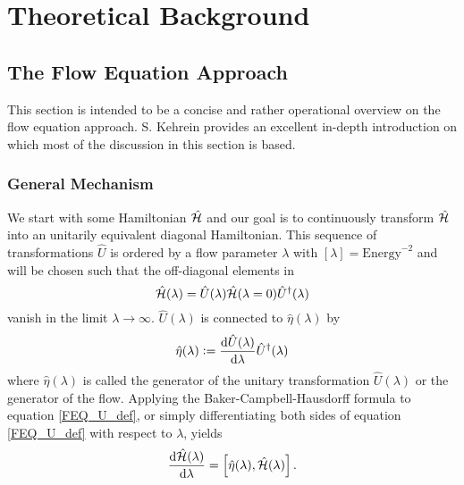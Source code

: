 \chapter{Theoretical Background}\label{Theoretical Background}
\section{The Flow Equation Approach}
This section is intended to be a concise and rather operational overview on the flow equation approach. S. Kehrein \cite{kehrein2006flow}  provides an excellent in-depth introduction on which most of the discussion in this section is based.
\subsection{General Mechanism}\label{General Mechanism}
We start with some Hamiltonian $\hat{\mathcal{H}}$ and our goal is to continuously transform $\hat{\mathcal{H}}$ into an unitarily equivalent diagonal Hamiltonian. This sequence of transformations $\hat U$ is ordered by a flow parameter $\lambda$ with $\left[\lambda\right]=\mathrm{Energy}^{-2}$ and will be chosen such that the off-diagonal elements in  
\begin{equation}\label{FEQ_U_def}
\hat{\mathcal{H}}(\lambda)=\hat U(\lambda)\hat{\mathcal{H}} (\lambda = 0)\hat U^\dagger (\lambda)
\end{equation}
vanish in the limit $\lambda\rightarrow\infty$. $\hat U(\lambda)$ is connected to $\hat\eta(\lambda)$ by
\begin{equation}
\hat\eta(\lambda)\defeq\frac{\mathrm d\hat U(\lambda)}{\mathrm d\lambda}\hat U^\dagger(\lambda)%
\end{equation}
where $\hat\eta(\lambda)$ is called the generator of the unitary transformation $\hat U(\lambda)$ or the generator of the flow. Applying the Baker-Campbell-Hausdorff formula to equation \ref{FEQ_U_def}, or simply differentiating both sides of equation \ref{FEQ_U_def} with respect to $\lambda$, yields
\begin{equation}\label{FEQ_ODE_def}
\frac{\mathrm d\hat{\mathcal{H}}(\lambda)}{\mathrm d\lambda} = \left[\hat\eta(\lambda),\hat{\mathcal{H}}(\lambda)\right].
\end{equation}
